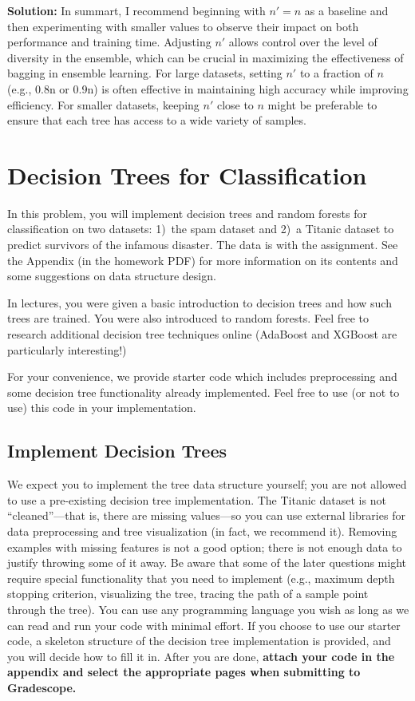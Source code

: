 \documentclass{article}
\newcommand{\Question}[1]{\Large \section{ #1 } \normalsize}
\newenvironment{solution}{\color{blue} \smallskip \textbf{Solution:}}{}
\begin{document}
\begin{enumerate}[(a)]
\begin{enumerate}[(i)]
\begin{solution}
In summart, I recommend beginning with \( n' = n \) as a baseline and then experimenting with smaller values to observe their impact on both performance and training time. Adjusting \( n' \) allows control over the level of diversity in the ensemble, which can be crucial in maximizing the effectiveness of bagging in ensemble learning. For large datasets, setting \( n' \) to a fraction of \( n \) (e.g., 0.8n or 0.9n) is often effective in maintaining high accuracy while improving efficiency. For smaller datasets, keeping \( n' \) close to \( n \) might be preferable to ensure that each tree has access to a wide variety of samples.




    	\end{solution}
    \end{enumerate}
\end{enumerate}


\newpage
\Question{Decision Trees for Classification}
In this problem, you will implement decision trees and random forests for classification on two datasets: 1)~the spam dataset and 2)~a Titanic dataset to predict survivors of the infamous disaster. 
The data is with the assignment. 
See the Appendix (in the homework PDF) for more information on its contents and some suggestions on data structure design.

In lectures, you were given a basic introduction to decision trees and how such trees are trained. 
You were also introduced to random forests. 
Feel free to research additional decision tree techniques online (AdaBoost and XGBoost are particularly interesting!)

For your convenience, we provide starter code which includes preprocessing and some decision tree functionality already implemented. 
Feel free to use (or not to use) this code in your implementation. 

\subsection{Implement Decision Trees}
We expect you to implement the tree data structure yourself; you are not allowed to use a pre-existing decision tree implementation. 
The Titanic dataset is not ``cleaned''---that is, there are missing values---so you can use external libraries for data preprocessing and tree visualization (in fact, we recommend it). 
Removing examples with missing features is not a good option; there is not enough data to justify throwing some of it away. 
Be aware that some of the later questions might require special functionality that you need to implement (e.g., maximum depth stopping criterion, visualizing the tree, tracing the path of a sample point through the tree). 
You can use any programming language you wish as long as we can read and run your code with minimal effort. 
If you choose to use our starter code, a skeleton structure of the decision tree implementation is provided, and you will decide how to fill it in. 
After you are done, \textbf{attach your code in the appendix and select the appropriate pages when submitting to Gradescope.}
\end{document}
